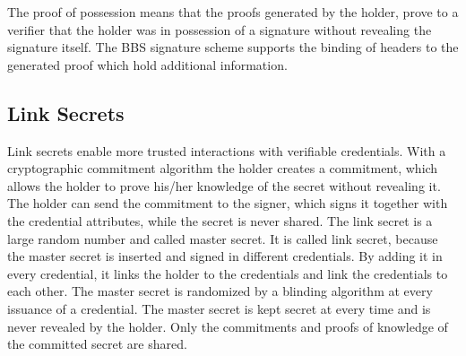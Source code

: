 \documentclass{article}
\begin{document}
The proof of possession means that the proofs generated by the holder, prove to a verifier that the holder was in possession of a signature without revealing the signature itself. The BBS signature scheme supports the binding of headers to the generated proof which hold additional information. 

\subsection{Link Secrets}

Link secrets enable more trusted interactions with verifiable credentials. With a cryptographic commitment algorithm the holder creates a commitment, which allows the holder to prove his/her knowledge of the secret without revealing it. The holder can send the commitment to the signer, which signs it together with the credential attributes, while the secret is never shared. The link secret is a large random number and called master secret. 
It is called link secret, because the master secret is inserted and signed in different credentials. By adding it in every credential, it links the holder to the credentials and link the credentials to each other. The master secret is randomized by a blinding algorithm at every issuance of a credential. The master secret is kept secret at every time and is never revealed by the holder. Only the commitments and proofs of knowledge of the committed secret are shared.



\end{document}
